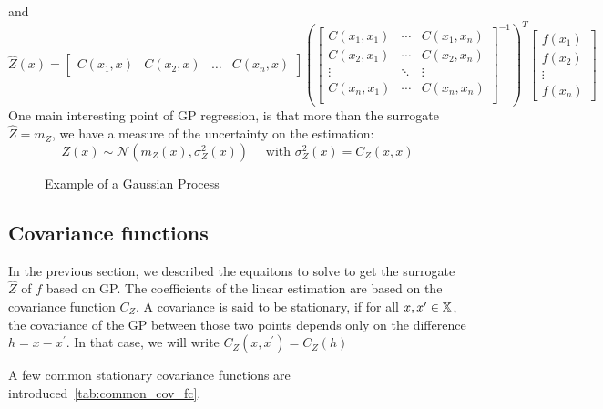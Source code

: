 \documentclass[../../Main_ManuscritThese.tex]{subfiles}
\newcommand\imgpath{/home/victor/acadwriting/Manuscrit/Text/Chapter4/img/}
\begin{document}
and
\begin{equation}
  \hat{Z}(x) =
      \begin{bmatrix}
      C(x_1, x) &
      C(x_2, x) &
      \dots &
      C(x_n, x)
      \end{bmatrix}
      \left(\begin{bmatrix} C(x_1, x_1) & \cdots & C(x_1, x_n)\\
      C(x_2, x_1) & \cdots & C(x_2, x_n) \\
      \vdots & \ddots & \vdots  \\
      C(x_n, x_1) & \cdots & C(x_n, x_n) \\
    \end{bmatrix}^{-1}\right)^T
  \begin{bmatrix}
    f(x_1) \\ f(x_2) \\ \vdots \\ f(x_n)
  \end{bmatrix}
\end{equation}
One main interesting point of GP regression, is that more than the surrogate $\hat{Z} = m_Z$, we have a measure of the uncertainty on the estimation:
\begin{equation}
  Z(x) \sim \mathcal{N}\left(m_Z(x), \sigma^2_Z(x)\right) \quad \text{ with } \sigma^2_Z(x) = C_Z(x, x)
\end{equation}

\begin{figure}[ht]
  \centering
  
  \caption{\label{fig:example_GP} Example of a Gaussian Process}
\end{figure}


\subsection{Covariance functions}
\label{sec:cov_fun}
In the previous section, we described the equaitons to solve to get the surrogate $\hat{Z}$ of $f$ based on GP.
The coefficients of the linear estimation are based on the covariance function $C_Z$.
A covariance is said to be stationary, if for all $x, x^{\prime} \in \mathbb{X}$, the covariance of the GP between those two points depends only on the  difference $h = x-x^{\prime}$. In that case, we will write $C_Z(x, x^{\prime}) = C_Z(h)$ 

A few common stationary covariance functions are introduced~\cref{tab:common_cov_fc}.
\end{document}
